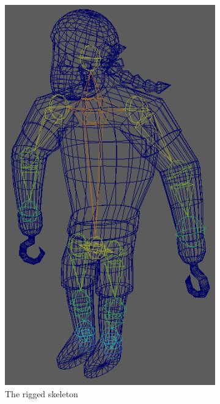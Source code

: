 \begin{figure}[h!]
	\centering
	\begin{subfigure}[b]{0.45\textwidth}
		\centering
		\includegraphics[scale=0.6]{figures/rigged_pirate.png}
		\caption{The rigged skeleton}
		\label{fig:rigged_pirate}
	\end{subfigure}
	\begin{subfigure}[b]{0.45\textwidth}
		\centering

\end{subfigure}
\end{figure}
